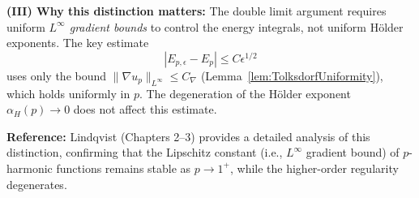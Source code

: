 \begin{remark}
\textbf{(III) Why this distinction matters:} The double limit argument requires uniform \emph{$L^\infty$ gradient bounds} to control the energy integrals, not uniform H\"older exponents. The key estimate
\[
    |E_{p,\epsilon} - E_p| \le C \epsilon^{1/2}
\]
uses only the bound $\|\nabla u_p\|_{L^\infty} \le C_\nabla$ (Lemma~\ref{lem:TolksdorfUniformity}), which holds uniformly in $p$. The degeneration of the H\"older exponent $\alpha_H(p) \to 0$ does not affect this estimate.

\textbf{Reference:} Lindqvist \cite{lindqvist2017} (Chapters 2--3) provides a detailed analysis of this distinction, confirming that the Lipschitz constant (i.e., $L^\infty$ gradient bound) of $p$-harmonic functions remains stable as $p \to 1^+$, while the higher-order regularity degenerates.
\end{remark}

